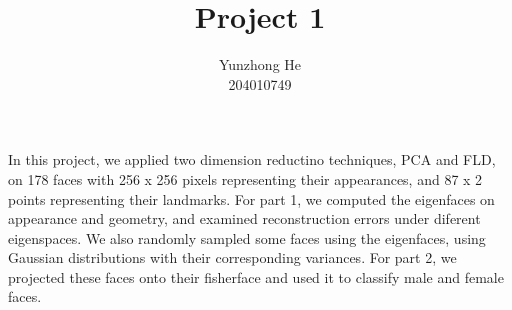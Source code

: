 \documentclass[12pt]{article}
\newenvironment{intro}[2][Introduction]{\begin{trivlist}
\item[\hskip \labelsep {\bfseries #1}\hskip \labelsep {\bfseries #2}]}{\end{trivlist}}
\begin{document}
 
 
\title{Project 1}%
\author{Yunzhong He\\ %
204010749} %
 
\maketitle

\begin{intro}{}
\item{}
In this project, we applied two dimension reductino techniques, PCA and FLD, on 178 faces with 256 x 256 pixels representing their appearances, and 87 x 2 points representing their landmarks. For part 1, we computed the eigenfaces on appearance and geometry, and examined reconstruction errors under diferent eigenspaces. We also randomly sampled some faces using the eigenfaces, using Gaussian distributions with their corresponding variances. For part 2, we projected these faces onto their fisherface and used it to classify male and female faces.
\end{intro}
\end{document}
